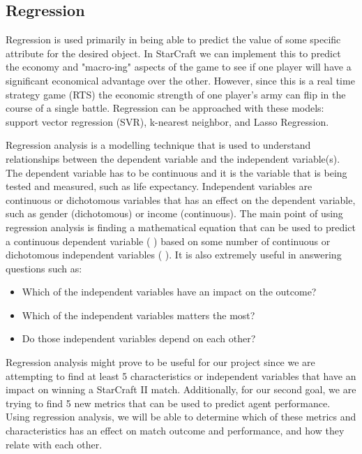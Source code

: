 \documentclass[a4paper,12pt]{report}
\begin{document}
\subsection{Regression}

Regression is used primarily in being able to predict the value of some specific attribute for the desired object. In StarCraft we can implement this to predict the economy and "macro-ing" aspects of the game to see if one player will have a significant economical advantage over the other. However, since this is a real time strategy game (RTS) the economic strength of one player’s army can flip in the course of a single battle. Regression can be approached with these models: support vector regression (SVR), k-nearest neighbor, and Lasso Regression.

Regression analysis is a modelling technique that is used to understand relationships between the dependent variable and the independent variable(s). The dependent variable has to be continuous and it is the variable that is being tested and measured, such as life expectancy. Independent variables are continuous or dichotomous variables that has an effect on the dependent variable, such as gender (dichotomous) or income (continuous). The main point of using regression analysis is finding a mathematical equation that can be used to predict a continuous dependent variable ( ) based on some number of continuous or dichotomous independent variables ( ). It is also extremely useful in answering questions such as:

\begin{itemize}[,]
    \setlength\itemsep{-.1cm}
    \item Which of the independent variables have an impact on the outcome?
    \item Which of the independent variables matters the most?
    \item Do those independent variables depend on each other?
\end{itemize}

Regression analysis might prove to be useful for our project since we are attempting to find at least 5 characteristics or independent variables that have an impact on winning a StarCraft II match. Additionally, for our second goal, we are trying to find 5 new metrics that can be used to predict agent performance. Using regression analysis, we will be able to determine which of these metrics and characteristics has an effect on match outcome and performance, and how they relate with each other.
\end{document}
